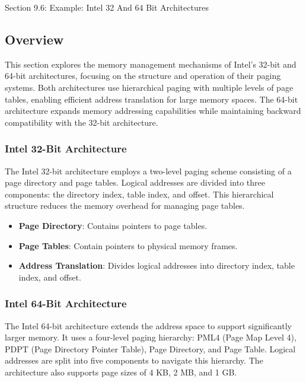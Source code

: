 \begin{notes}{Section 9.6: Example: Intel 32 And 64 Bit Architectures}
    \subsection*{Overview}

    This section explores the memory management mechanisms of Intel's 32-bit and 64-bit architectures, focusing on the structure and operation of their paging systems. Both architectures use hierarchical 
    paging with multiple levels of page tables, enabling efficient address translation for large memory spaces. The 64-bit architecture expands memory addressing capabilities while maintaining backward 
    compatibility with the 32-bit architecture.
    
    \subsubsection*{Intel 32-Bit Architecture}
    
    The Intel 32-bit architecture employs a two-level paging scheme consisting of a page directory and page tables. Logical addresses are divided into three components: the directory index, table index, 
    and offset. This hierarchical structure reduces the memory overhead for managing page tables.
    
    \begin{highlight}
    
        \begin{itemize}
            \item \textbf{Page Directory}: Contains pointers to page tables.
            \item \textbf{Page Tables}: Contain pointers to physical memory frames.
            \item \textbf{Address Translation}: Divides logical addresses into directory index, table index, and offset.
        \end{itemize}
    
    \end{highlight}
    
    \subsubsection*{Intel 64-Bit Architecture}
    
    The Intel 64-bit architecture extends the address space to support significantly larger memory. It uses a four-level paging hierarchy: PML4 (Page Map Level 4), PDPT (Page Directory Pointer Table), 
    Page Directory, and Page Table. Logical addresses are split into five components to navigate this hierarchy. The architecture also supports page sizes of 4 KB, 2 MB, and 1 GB.
    

\end{notes}
